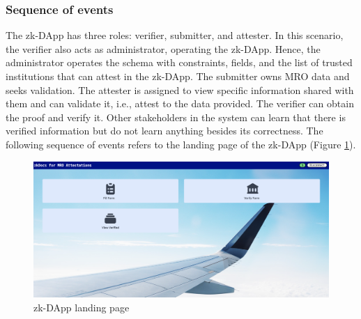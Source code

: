 \subsubsection{Sequence of events}
The zk-DApp has three roles: verifier, submitter, and attester. In this scenario, the verifier also acts as administrator, operating the zk-DApp. Hence, the administrator operates the schema with constraints, fields, and the list of trusted institutions that can attest in the zk-DApp. The submitter owns MRO data and seeks validation. The attester is assigned to view specific information shared with them and can validate it, i.e., attest to the data provided. The verifier can obtain the proof and verify it. Other stakeholders in the system can learn that there is verified information but do not learn anything besides its correctness. The following sequence of events refers to the landing page of the zk-DApp (Figure \ref{fig:landing-page}).
\begin{figure}[hbt]
	\centering
		\includegraphics[width=1.0\textwidth]{Pictures/landingpage.png}
	\caption{zk-DApp landing page}
	\label{fig:landing-page}
\end{figure}
